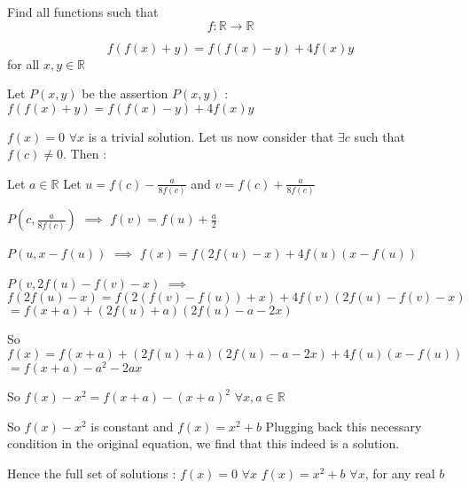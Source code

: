 \begin{solution}
	\begin{tcolorbox}Find all functions such that
\[ f: \mathbb R\to \mathbb R\]

\[ f(f(x) + y) = f(f(x) - y) + 4f(x)y\]
for all $ x,y \in \mathbb R$\end{tcolorbox}

Let $ P(x,y)$ be the assertion $ P(x,y)$ : $ f(f(x) + y) = f(f(x) - y) + 4f(x)y$

$ f(x) = 0$ $ \forall x$ is a trivial solution. Let us now consider that $ \exists c$ such that $ f(c)\neq 0$. Then :

Let $ a\in\mathbb R$
Let $ u = f(c) - \frac {a}{8f(c)}$ and  $ v = f(c) + \frac {a}{8f(c)}$

$ P(c,\frac {a}{8f(c)})$ $ \implies$ $ f(v) = f(u) + \frac a2$

$ P(u,x - f(u))$ $ \implies$ $ f(x) = f(2f(u) - x) + 4f(u)(x - f(u))$

$ P(v,2f(u) - f(v) - x)$ $ \implies$ $ f(2f(u) - x) = f(2(f(v) - f(u)) + x) + 4f(v)(2f(u) - f(v) - x)$ $ = f(x + a) + (2f(u) + a)(2f(u) - a - 2x)$

So $ f(x) = f(x + a) + (2f(u) + a)(2f(u) - a - 2x) + 4f(u)(x - f(u))$ $ = f(x + a) - a^2 - 2ax$

So $ f(x) - x^2 = f(x + a) - (x + a)^2$ $ \forall x,a\in\mathbb R$

So $ f(x) - x^2$ is constant and $ f(x) = x^2 + b$
Plugging back this necessary condition in the original equation, we find that this indeed is a solution.

Hence the full set of solutions :
$ f(x) = 0$ $ \forall x$
$ f(x) = x^2 + b$ $ \forall x$, for any real $ b$
\end{solution}



